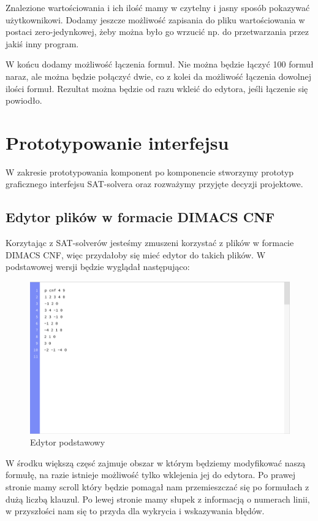 \documentclass[a4paper,12pt,oneside]{book}
\theoremstyle{definition}
\begin{document}
Znalezione wartościowania i ich ilość mamy w czytelny i jasny sposób pokazywać użytkownikowi. Dodamy jeszcze możliwość zapisania do pliku wartościowania w postaci zero-jedynkowej, żeby można było go wrzucić np. do przetwarzania przez jakiś inny program.

W końcu dodamy możliwość łączenia formuł. Nie można będzie łączyć 100 formuł naraz, ale można będzie połączyć dwie, co z kolei da możliwość łączenia dowolnej ilości formuł. Rezultat można będzie od razu wkleić do edytora, jeśli łączenie się powiodło.

\newpage

\section{Prototypowanie interfejsu}

W zakresie prototypowania komponent po komponencie stworzymy prototyp graficznego interfejsu SAT-solvera oraz rozważymy przyjęte decyzji projektowe.

\subsection{Edytor plików w formacie DIMACS CNF}

Korzytając z SAT-solverów jesteśmy zmuszeni korzystać z plików w formacie DIMACS CNF, więc przydałoby się mieć edytor do takich plików. W podstawowej wersji będzie wyglądał następująco:

\begin{figure}[ht]
    \centering
    \includegraphics[width=14.30cm]{1}
    \caption{Edytor podstawowy}
    \label{fig:1}
\end{figure}

\noindent W środku większą częsć zajmuje obszar w którym będziemy modyfikować naszą formułę, na razie istnieje możliwość tylko wklejenia jej do edytora. Po prawej stronie mamy scroll który będzie pomagał nam przemieszczać się po formułach z dużą liczbą klauzul. Po lewej stronie mamy słupek z informacją o numerach linii, w przyszłości nam się to przyda dla wykrycia i wskazywania błędów.
\end{document}
